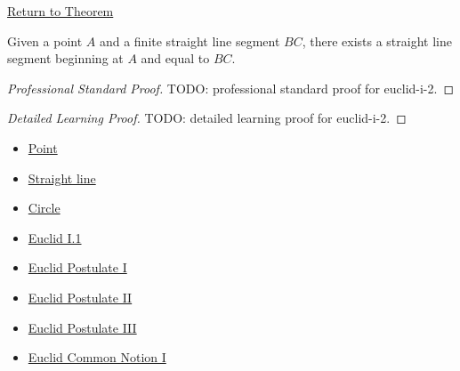 \newpage
{}
\label{prf:euclid-i-2}

\begin{remark*}[Return]
\hyperref[thm:euclid-i-2]{Return to Theorem}
\end{remark*}

\begin{theorem*}
Given a point $A$ and a finite straight line segment $BC$, there exists a
straight line segment beginning at $A$ and equal to $BC$.
\end{theorem*}

\begin{proof}[Professional Standard Proof]
\LRAProofBodyStart
TODO: professional standard proof for euclid-i-2.
\end{proof}

\begin{proof}[Detailed Learning Proof]
\LRAProofBodyStart
TODO: detailed learning proof for euclid-i-2.
\end{proof}

\begin{remark*}
\end{remark*}

\begin{dependencies}
\begin{itemize}
  \item \hyperref[def-euclid-point]{Point}
  \item \hyperref[def-euclid-straight-line]{Straight line}
  \item \hyperref[def-euclid-circle]{Circle}
  \item \hyperref[thm:euclid-i-1]{Euclid I.1}
  \item \hyperref[ax-euclid-postulate-draw-straight-line]{Euclid Postulate I}
  \item \hyperref[ax-euclid-postulate-produce-straight-line]{Euclid Postulate II}
  \item \hyperref[ax-euclid-postulate-describe-circle]{Euclid Postulate III}
  \item \hyperref[ax-euclid-common-notion-things-equal-to-same]{Euclid Common Notion I}
\end{itemize}
\end{dependencies}

\clearpage

